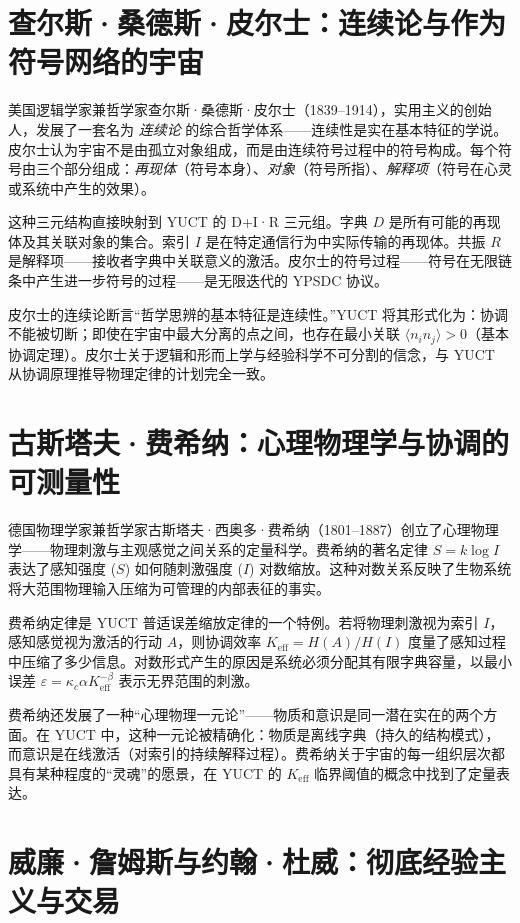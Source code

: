 \documentclass[12pt,a4paper]{article}
\begin{document}
	\section{查尔斯·桑德斯·皮尔士：连续论与作为符号网络的宇宙}
	
	美国逻辑学家兼哲学家查尔斯·桑德斯·皮尔士（1839–1914），实用主义的创始人，发展了一套名为 \emph{连续论} 的综合哲学体系——连续性是实在基本特征的学说。皮尔士认为宇宙不是由孤立对象组成，而是由连续符号过程中的符号构成。每个符号由三个部分组成：\emph{再现体}（符号本身）、\emph{对象}（符号所指）、\emph{解释项}（符号在心灵或系统中产生的效果）。
	
	这种三元结构直接映射到 YUCT 的 D+I·R 三元组。字典 \(D\) 是所有可能的再现体及其关联对象的集合。索引 \(I\) 是在特定通信行为中实际传输的再现体。共振 \(R\) 是解释项——接收者字典中关联意义的激活。皮尔士的符号过程——符号在无限链条中产生进一步符号的过程——是无限迭代的 YPSDC 协议。
	
	皮尔士的连续论断言“哲学思辨的基本特征是连续性。”YUCT 将其形式化为：协调不能被切断；即使在宇宙中最大分离的点之间，也存在最小关联 \(\langle n_i n_j \rangle > 0\)（基本协调定理）。皮尔士关于逻辑和形而上学与经验科学不可分割的信念，与 YUCT 从协调原理推导物理定律的计划完全一致。
	
	\section{古斯塔夫·费希纳：心理物理学与协调的可测量性}
	
	德国物理学家兼哲学家古斯塔夫·西奥多·费希纳（1801–1887）创立了心理物理学——物理刺激与主观感觉之间关系的定量科学。费希纳的著名定律 \(S = k \log I\) 表达了感知强度 (\(S\)) 如何随刺激强度 (\(I\)) 对数缩放。这种对数关系反映了生物系统将大范围物理输入压缩为可管理的内部表征的事实。
	
	费希纳定律是 YUCT 普适误差缩放定律的一个特例。若将物理刺激视为索引 \(I\)，感知感觉视为激活的行动 \(A\)，则协调效率 \(K_{\mathrm{eff}} = H(A)/H(I)\) 度量了感知过程中压缩了多少信息。对数形式产生的原因是系统必须分配其有限字典容量，以最小误差 \(\varepsilon = \kappa_c \alpha K_{\mathrm{eff}}^{-\beta}\) 表示无界范围的刺激。
	
	费希纳还发展了一种“心理物理一元论”——物质和意识是同一潜在实在的两个方面。在 YUCT 中，这种一元论被精确化：物质是离线字典（持久的结构模式），而意识是在线激活（对索引的持续解释过程）。费希纳关于宇宙的每一组织层次都具有某种程度的“灵魂”的愿景，在 YUCT 的 \(K_{\mathrm{eff}}\) 临界阈值的概念中找到了定量表达。
	
	\section{威廉·詹姆斯与约翰·杜威：彻底经验主义与交易}
	
\end{document}
